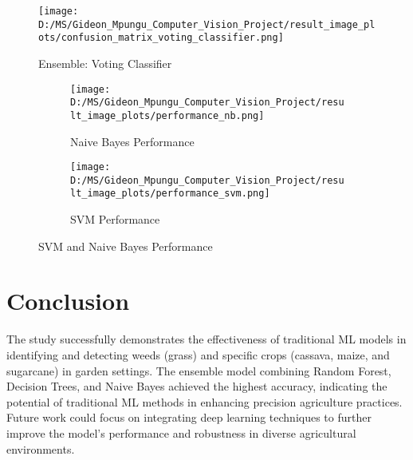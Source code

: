 \documentclass[10pt,twocolumn,letterpaper]{article}
\begin{document}
\begin{figure}[h]
    \texttt{[image: D:/MS/Gideon\_Mpungu\_Computer\_Vision\_Project/result\_image\_plots/confusion\_matrix\_voting\_classifier.png]}
    \caption{Ensemble: Voting Classifier}
    \label{fig:voting_classifier}
\end{figure}


\begin{figure*}[ht]
    \centering
    
    \begin{subfigure}{0.45\textwidth}
        \texttt{[image: D:/MS/Gideon\_Mpungu\_Computer\_Vision\_Project/result\_image\_plots/performance\_nb.png]}
        \caption{Naive Bayes Performance}
        \label{fig:nb_perf}
    \end{subfigure}
    \hfill
    \begin{subfigure}{0.45\textwidth}
        \texttt{[image: D:/MS/Gideon\_Mpungu\_Computer\_Vision\_Project/result\_image\_plots/performance\_svm.png]}
        \caption{SVM Performance}
        \label{fig:svm_perf}
    \end{subfigure}
    
    \caption{SVM and Naive Bayes Performance}
    \label{fig:svm_and_nb_perf}
\end{figure*}




\section{Conclusion}
The study successfully demonstrates the effectiveness of traditional ML models in identifying and detecting weeds (grass) and specific crops (cassava, maize, and sugarcane) in garden settings. The ensemble model combining Random Forest, Decision Trees, and Naive Bayes achieved the highest accuracy, indicating the potential of traditional ML methods in enhancing precision agriculture practices. Future work could focus on integrating deep learning techniques to further improve the model's performance and robustness in diverse agricultural environments.
\end{document}
